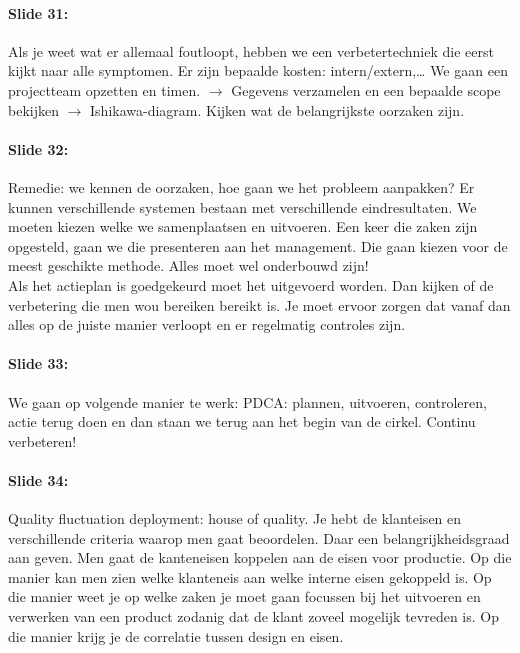\documentclass[10pt,a4paper]{report}
\begin{document}
\paragraph{Slide 31:} Als je weet wat er allemaal foutloopt, hebben we een verbetertechniek die eerst kijkt naar alle symptomen. Er zijn bepaalde kosten: intern/extern,… We gaan een projectteam opzetten en timen. $\rightarrow$ Gegevens verzamelen en een bepaalde scope bekijken $\rightarrow$ Ishikawa-diagram. Kijken wat de belangrijkste oorzaken zijn. 

\paragraph{Slide 32:} Remedie: we kennen de oorzaken, hoe gaan we het probleem aanpakken? Er kunnen verschillende systemen bestaan met verschillende eindresultaten. We moeten kiezen welke we samenplaatsen en uitvoeren. Een keer die zaken zijn opgesteld, gaan we die presenteren aan het management. Die gaan kiezen voor de meest geschikte methode. Alles moet wel onderbouwd zijn!\\
Als het actieplan is goedgekeurd moet het uitgevoerd worden. Dan kijken of de verbetering die men wou bereiken bereikt is. Je moet ervoor zorgen dat vanaf dan alles op de juiste manier verloopt en er regelmatig controles zijn.

\paragraph{Slide 33:} We gaan op volgende manier te werk: PDCA: plannen, uitvoeren, controleren, actie terug doen en dan staan we terug aan het begin van de cirkel. Continu verbeteren!

\paragraph{Slide 34:} Quality fluctuation deployment: house of quality. Je hebt de klanteisen en verschillende criteria waarop men gaat beoordelen. Daar een belangrijkheidsgraad aan geven. Men gaat de kanteneisen koppelen aan de eisen voor productie. Op die manier kan men zien welke klanteneis aan welke interne eisen gekoppeld is. Op die manier weet je op welke zaken je moet gaan focussen bij het uitvoeren en verwerken van een product zodanig dat de klant zoveel mogelijk tevreden is. Op die manier krijg je de correlatie tussen design en eisen.
\end{document}
